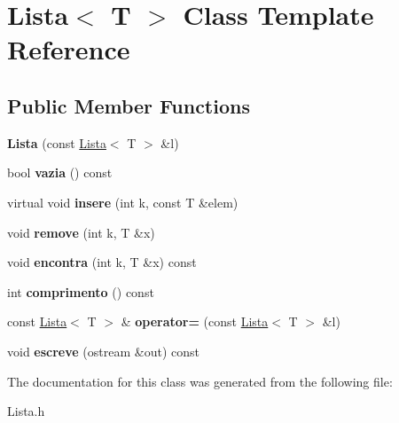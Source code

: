 \hypertarget{class_lista}{\section{Lista$<$ T $>$ Class Template Reference}
\label{class_lista}
}
\subsection*{Public Member Functions}
\begin{DoxyCompactItemize}
\item 
\hypertarget{class_lista_ac9895a302242ab2d624e054357aeb13c}{{\bfseries Lista} (const \hyperlink{class_lista}{Lista}$<$ T $>$ \&l)}\label{class_lista_ac9895a302242ab2d624e054357aeb13c}

\item 
\hypertarget{class_lista_ae3828235e6a4433d0422d24f97ce4e86}{bool {\bfseries vazia} () const }\label{class_lista_ae3828235e6a4433d0422d24f97ce4e86}

\item 
\hypertarget{class_lista_ac206589a21c500b5a087947dea761ef9}{virtual void {\bfseries insere} (int k, const T \&elem)}\label{class_lista_ac206589a21c500b5a087947dea761ef9}

\item 
\hypertarget{class_lista_aa12705aedd6c49162a220b5820b8cd7a}{void {\bfseries remove} (int k, T \&x)}\label{class_lista_aa12705aedd6c49162a220b5820b8cd7a}

\item 
\hypertarget{class_lista_aabc83f60d1979de9bad6bab3460efbca}{void {\bfseries encontra} (int k, T \&x) const }\label{class_lista_aabc83f60d1979de9bad6bab3460efbca}

\item 
\hypertarget{class_lista_adea61db738ff507c265fd01ac089a31f}{int {\bfseries comprimento} () const }\label{class_lista_adea61db738ff507c265fd01ac089a31f}

\item 
\hypertarget{class_lista_a75e5e9021622daab3a4b24e88c8cbc50}{const \hyperlink{class_lista}{Lista}$<$ T $>$ \& {\bfseries operator=} (const \hyperlink{class_lista}{Lista}$<$ T $>$ \&l)}\label{class_lista_a75e5e9021622daab3a4b24e88c8cbc50}

\item 
\hypertarget{class_lista_ad322147227cd1aa8ee3c44475080823b}{void {\bfseries escreve} (ostream \&out) const }\label{class_lista_ad322147227cd1aa8ee3c44475080823b}

\end{DoxyCompactItemize}


The documentation for this class was generated from the following file\-:\begin{DoxyCompactItemize}
\item 
Lista.\-h\end{DoxyCompactItemize}
